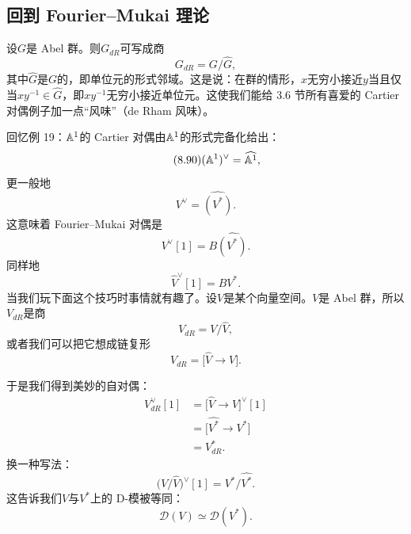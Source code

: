 \subsection*{回到 Fourier--Mukai 理论}
设$G$是 Abel 群。则$G_{dR}$可写成商
\begin{equation}\tag{8.89}
G_{dR}=G/\widehat G,
\end{equation}
其中$\widehat G$是$G$的，即单位元的形式邻域。这是说：在群的情形，$x$无穷小接近$y$当且仅当$xy^{-1}\in\widehat G$，即$xy^{-1}$无穷小接近单位元。这使我们能给 3.6 节所有喜爱的 Cartier 对偶例子加一点“风味”（de Rham 风味）。

回忆例 19：$\mathbb{A}^{1}$的 Cartier 对偶由$\mathbb{A}^{1}$的形式完备化给出：
\begin{equation}\tag{8.90}
(\mathbb{A}^{1})^{\vee}=\widehat{\mathbb{A}^{1}},
\end{equation}
更一般地
\begin{equation}\tag{8.91}
V^{\vee}=\widehat{(V^{*})}.
\end{equation}
这意味着 Fourier--Mukai 对偶是
\begin{equation}\tag{8.92}
V^{\vee}[1]=B\widehat{(V^{*})}.
\end{equation}
同样地
\begin{equation}\tag{8.93}
\widehat{V}^{\vee}[1]=BV^{*}.
\end{equation}
当我们玩下面这个技巧时事情就有趣了。设$V$是某个向量空间。$V$是 Abel 群，所以$V_{dR}$是商
\begin{equation}\tag{8.94}
V_{dR}=V/\widehat V,
\end{equation}
或者我们可以把它想成链复形
\begin{equation}\tag{8.95}
V_{dR}=\big[\widehat V\to V\big].
\end{equation}

于是我们得到美妙的自对偶：
\begin{align}
V^{\vee}_{dR}[1]&=\big[\widehat V\to V\big]^{\vee}[1]\tag{8.96}\\
&=\big[\widehat{V^{*}}\to V^{*}\big]\tag{8.97}\\
&=V^{*}_{dR}.\tag{8.98}
\end{align}
换一种写法：
\begin{equation}\tag{8.99}
\bigl(V/\widehat V\bigr)^{\vee}[1]=V^{*}/\widehat{V^{*}}.
\end{equation}
这告诉我们$V$与$V^{*}$上的 D-模被等同：
\begin{equation}\tag{8.100}
\mathcal D(V)\simeq\mathcal D(V^{*}).
\end{equation}

